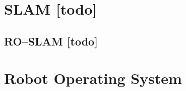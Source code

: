 \begin{comment}
------------------------------------------------------------------------------------------
Embodied Localisation and Mapping
http://elib.suub.uni-bremen.de/edocs/00103537-1.pdf

"C:\Users\Albert\Documents\Studium\Bachelor WS17\scientific publication\Efficient probabilistic range-only SLAM.ppt"


- \citez{montemerlo2002fastslam}
	- FastSLAM: A factored solution to the simultaneous localization and mapping problem

- \cite{sarkka2013bayesian}
	- Bayesian filtering and smoothing
- \cite{kurth2003experimental}
	- The Kalman Filter approach described in Section 5 can be reformulated for the SLAM problem. To perform SLAM, we include position estimates for each tag in the state, producing a state vector of the form: q(k) = [xk; yk; k; xb1; yb1 ; :::; xbn; ybn]T , where n is the number of beacons.
	
- The purpose of a probabilistic approach to RO-SLAM is to obtain the joint probability distribution of the robot pose (or path) and the map, given all the available data at some instant of time. This distribution represents our knowledge about the robot path, the map, and all their correlations.
\end{comment}
\section{SLAM [todo]}


\begin{comment}
------------------------------------------------------------------------------------------
\end{comment}
\subsection{RO--SLAM [todo]}


\begin{comment}
------------------------------------------------------------------------------------------
- \url{https://www.heise.de/developer/artikel/Einfuehrung-in-das-Robot-Operating-System-3273655.html?seite=all}
- Node = Knoten
- Topic = Datenbus
- Service = Dienst
- Message = Nachricht
- Launch-Files = Startdateien
\end{comment}
\section{Robot Operating System}

